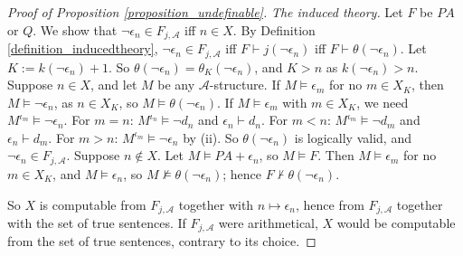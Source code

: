 \documentclass{amsart}  %
\numberwithin{equation}{section}
\theoremstyle{definition}
\theoremstyle{remark}
\begin{document}
\begin{proof} [Proof of Proposition \ref{proposition_undefinable}]
\emph{The induced theory.} Let $F$ be $PA$ or $Q$. We show that $\neg \epsilon _{n} \in F _{j, \mathcal{A}}$ iff $n \in X$. By Definition \ref{definition_inducedtheory}, $\neg \epsilon _{n} \in F _{j, \mathcal{A}}$ iff $F \vdash j (\neg \epsilon _{n})$ iff $F \vdash \theta (\neg \epsilon _{n})$. Let $K := k (\neg \epsilon _{n}) + 1$. So $\theta (\neg \epsilon _{n}) = \theta _{K} (\neg \epsilon _{n})$, and $K > n$ as $k (\neg \epsilon _{n}) > n$. Suppose $n \in X$, and let $M$ be any $\mathcal{A}$-structure. If $M \models \epsilon _{m}$ for no $m \in X _{K}$, then $M \models \neg \epsilon _{n}$, as $n \in X _{K}$, so $M \models \theta (\neg \epsilon _{n})$. If $M \models \epsilon _{m}$ with $m \in X _{K}$, we need $M ^{\iota _{m}} \models \neg \epsilon _{n}$. For $m = n$: $M ^{\iota _{n}} \models \neg d _{n}$ and $\epsilon _{n} \vdash d _{n}$. For $m < n$: $M ^{\iota _{m}} \models \neg d _{m}$ and $\epsilon _{n} \vdash d _{m}$. For $m > n$: $M ^{\iota _{m}} \models \neg \epsilon _{n}$ by (ii). So $\theta (\neg \epsilon _{n})$ is logically valid, and $\neg \epsilon _{n} \in F _{j, \mathcal{A}}$. Suppose $n \notin X$. Let $M \models PA + \epsilon _{n}$, so $M \models F$. Then $M \models \epsilon _{m}$ for no $m \in X _{K}$, and $M \models \epsilon _{n}$, so $M \not \models \theta (\neg \epsilon _{n})$; hence $F \nvdash \theta (\neg \epsilon _{n})$.

So $X$ is computable from $F _{j, \mathcal{A}}$ together with $n \mapsto \epsilon _{n}$, hence from $F _{j, \mathcal{A}}$ together with the set of true sentences. If $F _{j, \mathcal{A}}$ were arithmetical, $X$ would be computable from the set of true sentences, contrary to its choice.
\end{proof}
\end{document}
